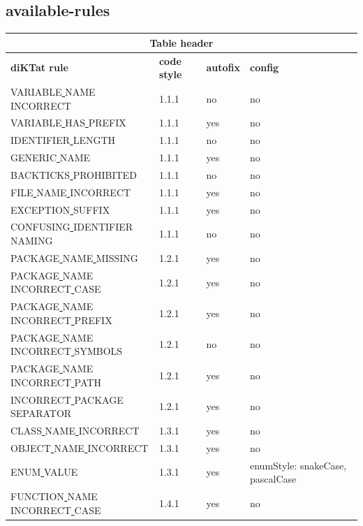 \subsection{available-rules}
\begin{center}
\scriptsize
\begin{longtable}{ |l|p{0.8cm}|p{0.8cm}| p{3cm} | }
\hline
\multicolumn{4}{|c|}{Table header} \\ 
\hline
\textbf{diKTat rule} & \textbf{code style} & \textbf{autofix} &  \textbf{config} \\
\hline
VARIABLE\underline{ }NAME\underline{ }INCORRECT & 1.1.1 &  no  &   no  \\
VARIABLE\underline{ }HAS\underline{ }PREFIX & 1.1.1 &  yes  &   no  \\
IDENTIFIER\underline{ }LENGTH & 1.1.1 &  no  &   no  \\
GENERIC\underline{ }NAME & 1.1.1 &  yes  &   no  \\
BACKTICKS\underline{ }PROHIBITED & 1.1.1 &  no  &   no  \\
FILE\underline{ }NAME\underline{ }INCORRECT & 1.1.1 &  yes  &   no  \\
EXCEPTION\underline{ }SUFFIX & 1.1.1 &  yes  &   no  \\
CONFUSING\underline{ }IDENTIFIER\underline{ }NAMING & 1.1.1 &  no  &   no  \\
PACKAGE\underline{ }NAME\underline{ }MISSING & 1.2.1 &  yes  &   no  \\
PACKAGE\underline{ }NAME\underline{ }INCORRECT\underline{ }CASE & 1.2.1 &  yes  &   no  \\
PACKAGE\underline{ }NAME\underline{ }INCORRECT\underline{ }PREFIX & 1.2.1 &  yes  &   no  \\
PACKAGE\underline{ }NAME\underline{ }INCORRECT\underline{ }SYMBOLS & 1.2.1 &  no  &   no  \\
PACKAGE\underline{ }NAME\underline{ }INCORRECT\underline{ }PATH & 1.2.1 &  yes  &   no  \\
INCORRECT\underline{ }PACKAGE\underline{ }SEPARATOR & 1.2.1 &  yes  &   no  \\
CLASS\underline{ }NAME\underline{ }INCORRECT & 1.3.1 &  yes  &   no  \\
OBJECT\underline{ }NAME\underline{ }INCORRECT & 1.3.1 &  yes  &   no  \\
ENUM\underline{ }VALUE & 1.3.1 &  yes  &   enumStyle: snakeCase, pascalCase  \\
FUNCTION\underline{ }NAME\underline{ }INCORRECT\underline{ }CASE & 1.4.1 &  yes  &   no  \\

\end{longtable}
\end{center}
